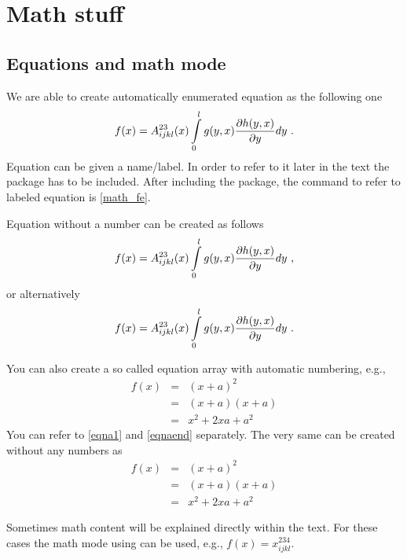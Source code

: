 \chapter{Math stuff}


\section{Equations and math mode}

We are able to create automatically enumerated equation as the following one
\begin{equation}
	f(x)
	= A^{23}_{ijkl}(x) \int_0^l\limits g(y,x) \frac{\partial h(y,x)}{\partial y} d y \ .
	\label{math_fe}
\end{equation}
Equation can be given a name/label. In order to refer to it later in the text the package  has to be included. After including the package, the command to refer to labeled equation is \eqref{math_fe}.

Equation without a number can be created as follows
\begin{equation*}
	f(x)
	= A^{23}_{ijkl}(x) \int_0^l\limits g(y,x) \frac{\partial h(y,x)}{\partial y} d y \ ,
\end{equation*}
or alternatively 
\[
	f(x)
	= A^{23}_{ijkl}(x) \int_0^l\limits g(y,x) \frac{\partial h(y,x)}{\partial y} d y \ .
\]

You can also create a so called equation array with automatic numbering, e.g.,
\begin{eqnarray}
	f(x)
		&=& (x+a)^2 \label{eqna1} \\
		&=& (x+a)(x+a) \label{eqna2}\\
		&=& x^2 + 2 x a + a^2
	\label{eqnaend}
\end{eqnarray}
You can refer to \eqref{eqna1} and \eqref{eqnaend} separately. The very same can be created without any numbers as
\begin{eqnarray*}
	f(x)
		&=& (x+a)^2 \\
		&=& (x+a)(x+a) \\
		&=& x^2 + 2 x a + a^2
\end{eqnarray*}

Sometimes math content will be explained directly within the text. For these cases the math mode using \imp{\$\$} can be used, e.g., $f(x) = x^{234}_{ijkl}$.


